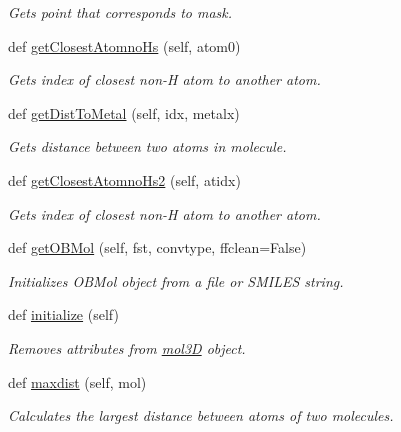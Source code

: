 \begin{DoxyCompactItemize}
\begin{DoxyCompactList}\small\item\em Gets point that corresponds to mask. \end{DoxyCompactList}\item 
def \hyperlink{classmolSimplify_1_1Classes_1_1mol3D_1_1mol3D_a3f137b174fb3b427893ed88d685888ce}{get\+Closest\+Atomno\+Hs} (self, atom0)
\begin{DoxyCompactList}\small\item\em Gets index of closest non-\/H atom to another atom. \end{DoxyCompactList}\item 
def \hyperlink{classmolSimplify_1_1Classes_1_1mol3D_1_1mol3D_abdd4f09ed5f39c96a5025fa9d049f2e8}{get\+Dist\+To\+Metal} (self, idx, metalx)
\begin{DoxyCompactList}\small\item\em Gets distance between two atoms in molecule. \end{DoxyCompactList}\item 
def \hyperlink{classmolSimplify_1_1Classes_1_1mol3D_1_1mol3D_a911ffafa9384284b123be8c1670220ca}{get\+Closest\+Atomno\+Hs2} (self, atidx)
\begin{DoxyCompactList}\small\item\em Gets index of closest non-\/H atom to another atom. \end{DoxyCompactList}\item 
def \hyperlink{classmolSimplify_1_1Classes_1_1mol3D_1_1mol3D_a4a723fdb1daadc53a524243198fb15cb}{get\+O\+B\+Mol} (self, fst, convtype, ffclean=False)
\begin{DoxyCompactList}\small\item\em Initializes O\+B\+Mol object from a file or S\+M\+I\+L\+ES string. \end{DoxyCompactList}\item 
def \hyperlink{classmolSimplify_1_1Classes_1_1mol3D_1_1mol3D_ab2935f2310ca23b0c77e4ef3ac11a6f9}{initialize} (self)
\begin{DoxyCompactList}\small\item\em Removes attributes from \hyperlink{classmolSimplify_1_1Classes_1_1mol3D_1_1mol3D}{mol3D} object. \end{DoxyCompactList}\item 
def \hyperlink{classmolSimplify_1_1Classes_1_1mol3D_1_1mol3D_a7d3399262fb568aeec589f86ff59d376}{maxdist} (self, mol)
\begin{DoxyCompactList}\small\item\em Calculates the largest distance between atoms of two molecules. \end{DoxyCompactList}\item 

\end{DoxyCompactItemize}
